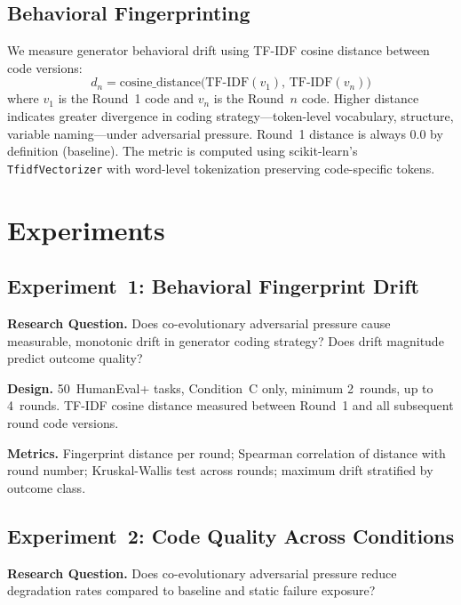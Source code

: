 \documentclass[11pt,letterpaper]{article}
\begin{document}
\subsection{Behavioral Fingerprinting}

We measure generator behavioral drift using TF-IDF cosine distance between code
versions:
\begin{equation}
  d_{n} = \text{cosine\_distance}\!\bigl(\text{TF-IDF}(v_1),\,\text{TF-IDF}(v_n)\bigr)
  \label{eq:fingerprint}
\end{equation}
where $v_1$ is the Round~1 code and $v_n$ is the Round~$n$ code. Higher
distance indicates greater divergence in coding strategy---token-level
vocabulary, structure, variable naming---under adversarial pressure. Round~1
distance is always 0.0 by definition (baseline). The metric is computed using
scikit-learn's \texttt{TfidfVectorizer} with word-level tokenization preserving
code-specific tokens.

\section{Experiments}

\subsection{Experiment~1: Behavioral Fingerprint Drift}

\textbf{Research Question.}
Does co-evolutionary adversarial pressure cause measurable, monotonic drift in
generator coding strategy? Does drift magnitude predict outcome quality?

\textbf{Design.}
50~HumanEval+ tasks, Condition~C only, minimum 2~rounds, up to 4~rounds.
TF-IDF cosine distance measured between Round~1 and all subsequent round code
versions.

\textbf{Metrics.}
Fingerprint distance per round; Spearman correlation of distance with round
number; Kruskal-Wallis test across rounds; maximum drift stratified by outcome
class.

\subsection{Experiment~2: Code Quality Across Conditions}

\textbf{Research Question.}
Does co-evolutionary adversarial pressure reduce degradation rates compared to
baseline and static failure exposure?
\end{document}
